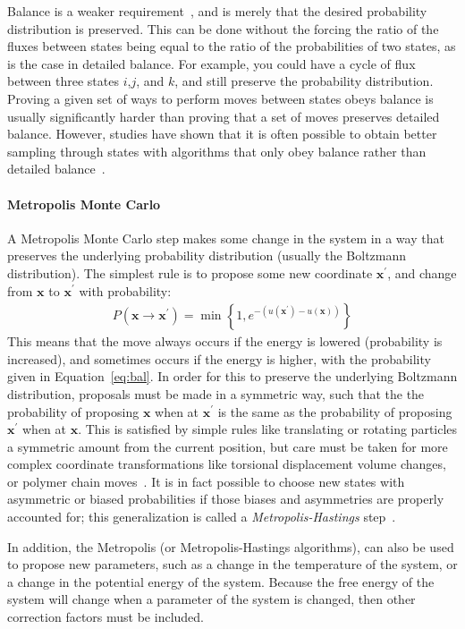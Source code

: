 \documentclass[9pt,review]{livecoms}
\newcommand{\vx}{\mathbf{x}}
\begin{document}
Balance is a weaker requirement~\cite{deem:jcp:1999:balance}, and is merely that the desired probability distribution is preserved. This can be done without the forcing the ratio of the fluxes between states being equal to the ratio of the probabilities of two states, as is the case in detailed balance.  For example, you could have a cycle of flux between three states $i$,$j$, and $k$, and still preserve the probability distribution.  Proving a given set of ways to perform moves between states obeys balance is usually significantly harder than proving that a set of moves preserves detailed balance.
However, studies have shown that it is often possible to obtain better sampling through states with algorithms that only obey balance rather than detailed balance~\citep{deem:jcp:1999:balance,Faizi:JCTC:2020}.

\hypertarget{ref:MetropolisMonteCarlo} {\paragraph{Metropolis Monte Carlo}}
A Metropolis Monte Carlo step makes some change in the system in a way that preserves the underlying probability distribution (usually the Boltzmann distribution).  The simplest rule is to propose some new coordinate $\vx^\prime$, and change from $\vx$ to $\vx^\prime$ with probability:
\begin{eqnarray}
P(\vx\rightarrow \vx^\prime) = \min\left\{1, e^{-(u(\vx^\prime)-u(\vx))}\right\}
\label{eq:bal}
\end{eqnarray}
This means that the move always occurs if the energy is lowered (probability is increased), and sometimes occurs if the energy is higher, with the probability given in Equation~\ref{eq:bal}.
In order for this to preserve the underlying Boltzmann distribution, proposals must be made in a symmetric way, such that the the probability of proposing $\vx$ when at $\vx^\prime$ is the same as the probability of proposing $\vx^\prime$ when at $\vx$. This is satisfied by simple rules like translating or rotating particles a symmetric amount from the current position, but care must be taken for more complex coordinate transformations like torsional displacement volume changes, or polymer chain moves~\cite{Siepmann_mp_1992}.  It is in fact possible to choose new states with asymmetric or biased probabilities if those biases and asymmetries are properly accounted for; this generalization is called a \emph{Metropolis-Hastings} step~\cite{Hastings_biometrika_1970}.

In addition, the Metropolis (or Metropolis-Hastings algorithms), can also be used to propose new parameters, such as a change in the temperature of the system, or a change in the potential energy of the system. Because the free energy of the system will change when a parameter of the system is changed, then other correction factors must be included.
\end{document}
